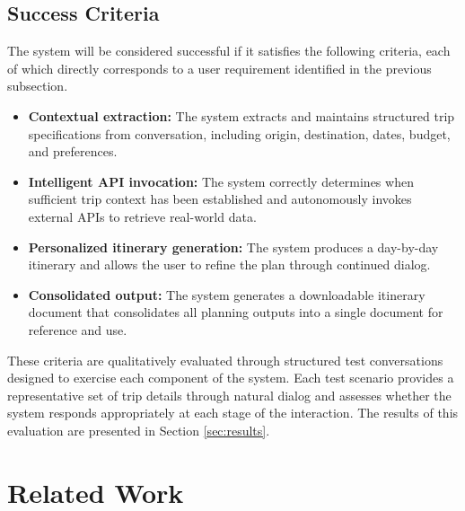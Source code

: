 \documentclass{article}
\begin{document}
\subsection{Success Criteria}
The system will be considered successful if it satisfies the following criteria, each of which directly corresponds to a user requirement identified in the previous subsection.
\begin{itemize}[noitemsep, topsep=0pt]
    \item \textbf{Contextual extraction:} The system extracts and maintains structured trip specifications from conversation, including origin, destination, dates, budget, and preferences.
    \item \textbf{Intelligent API invocation:} The system correctly determines when sufficient trip context has been established and autonomously invokes external APIs to retrieve real-world data.
    \item \textbf{Personalized itinerary generation:} The system produces a day-by-day itinerary and allows the user to refine the plan through continued dialog.
    \item \textbf{Consolidated output:} The system generates a downloadable itinerary document that consolidates all planning outputs into a single document for reference and use.
\end{itemize}

These criteria are qualitatively evaluated through structured test conversations designed to exercise each component of the system. Each test scenario provides a representative set of trip details through natural dialog and assesses whether the system responds appropriately at each stage of the interaction. The results of this evaluation are presented in Section \ref{sec:results}.


\section{Related Work}
\label{sec:related}
\end{document}
